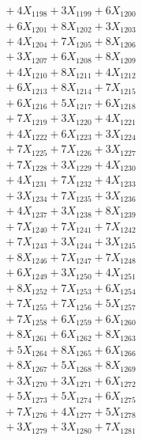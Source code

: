 \documentclass[a4paper,10pt]{article}
\begin{document}
{\begin{align}
&\;  + 4 X_{1198} + 3 X_{1199} + 6 X_{1200} \\[0.3ex]
&\;  + 6 X_{1201} + 8 X_{1202} + 3 X_{1203} \\[0.3ex]
&\;  + 4 X_{1204} + 7 X_{1205} + 8 X_{1206} \\[0.3ex]
&\;  + 3 X_{1207} + 6 X_{1208} + 8 X_{1209} \\[0.5ex]\allowbreak
&\;  + 4 X_{1210} + 8 X_{1211} + 4 X_{1212} \\[0.3ex]
&\;  + 6 X_{1213} + 8 X_{1214} + 7 X_{1215} \\[0.3ex]
&\;  + 6 X_{1216} + 5 X_{1217} + 6 X_{1218} \\[0.3ex]
&\;  + 7 X_{1219} + 3 X_{1220} + 4 X_{1221} \\[0.3ex]
&\;  + 4 X_{1222} + 6 X_{1223} + 3 X_{1224} \\[0.3ex]
&\;  + 7 X_{1225} + 7 X_{1226} + 3 X_{1227} \\[0.3ex]
&\;  + 7 X_{1228} + 3 X_{1229} + 4 X_{1230} \\[0.3ex]
&\;  + 4 X_{1231} + 7 X_{1232} + 4 X_{1233} \\[0.3ex]
&\;  + 3 X_{1234} + 7 X_{1235} + 3 X_{1236} \\[0.3ex]
&\;  + 4 X_{1237} + 3 X_{1238} + 8 X_{1239} \\[0.5ex]\allowbreak
&\;  + 7 X_{1240} + 7 X_{1241} + 7 X_{1242} \\[0.3ex]
&\;  + 7 X_{1243} + 3 X_{1244} + 3 X_{1245} \\[0.3ex]
&\;  + 8 X_{1246} + 7 X_{1247} + 7 X_{1248} \\[0.3ex]
&\;  + 6 X_{1249} + 3 X_{1250} + 4 X_{1251} \\[0.3ex]
&\;  + 8 X_{1252} + 7 X_{1253} + 6 X_{1254} \\[0.3ex]
&\;  + 7 X_{1255} + 7 X_{1256} + 5 X_{1257} \\[0.3ex]
&\;  + 7 X_{1258} + 6 X_{1259} + 6 X_{1260} \\[0.3ex]
&\;  + 8 X_{1261} + 6 X_{1262} + 8 X_{1263} \\[0.3ex]
&\;  + 5 X_{1264} + 8 X_{1265} + 6 X_{1266} \\[0.3ex]
&\;  + 8 X_{1267} + 5 X_{1268} + 8 X_{1269} \\[0.5ex]\allowbreak
&\;  + 3 X_{1270} + 3 X_{1271} + 6 X_{1272} \\[0.3ex]
&\;  + 5 X_{1273} + 5 X_{1274} + 6 X_{1275} \\[0.3ex]
&\;  + 7 X_{1276} + 4 X_{1277} + 5 X_{1278} \\[0.3ex]
&\;  + 3 X_{1279} + 3 X_{1280} + 7 X_{1281} \\[0.3ex]

\end{align}}
\end{document}
